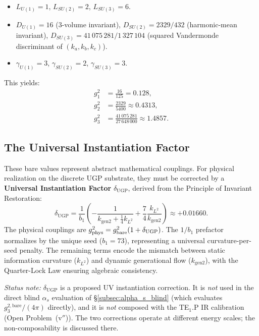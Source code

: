 \documentclass[11pt]{article}
\theoremstyle{remark}
\newcommand{\UGP}{\text{UGP}}
\begin{document}
\begin{tcolorbox}[colback=yellow!6!white,colframe=yellow!40!black,
title=\textbf{Gauge Coupling Master Formula}]
\begin{itemize}[leftmargin=1.2em,itemsep=0.2em]
    \item $L_{U(1)} = 1$, \; $L_{SU(2)} = 2$, \; $L_{SU(3)} = 6$.
    \item $D_{U(1)} = 16$ (3-volume invariant), \; $D_{SU(2)} = 2329/432$ (harmonic-mean invariant), \; $D_{SU(3)} = 41\,075\,281/1\,327\,104$ (squared Vandermonde discriminant of $(k_a, k_b, k_c)$).
    \item $\gamma_{U(1)} = 3$, \; $\gamma_{SU(2)} = 2$, \; $\gamma_{SU(3)} = 3$.
\end{itemize}
This yields:
\[
\begin{aligned}
g_1^2 &= \frac{16}{125} = 0.128, \\
g_2^2 &= \frac{2329}{5400} \approx 0.4313, \\
g_3^2 &= \frac{41\,075\,281}{27\,648\,000} \approx 1.4857.
\end{aligned}
\]
\end{tcolorbox}


\subsection{The Universal Instantiation Factor}

These bare values represent abstract mathematical couplings.
For physical realization on the discrete UGP substrate, they must be corrected by a \textbf{Universal Instantiation Factor} $\delta_{\UGP}$, derived from the Principle of Invariant Restoration:
\begin{equation}
\delta_{\UGP} = \frac{1}{b_1}\left(-\frac{1}{k_{\mathrm{gen2}} + \frac{1}{4}k_{L^2}} + \frac{7}{4}\frac{k_{L^2}}{k_{\mathrm{gen2}}}\right) \approx +0.01660.
\label{eq:instantiation}
\end{equation}
The physical couplings are $g_{\rm phys}^2 = g_{\rm bare}^2 (1 + \delta_{\UGP})$.
The $1/b_1$ prefactor normalizes by the unique seed ($b_1 = 73$), representing a universal curvature-per-seed penalty.
The remaining terms encode the mismatch between static information curvature ($k_{L^2}$) and dynamic generational flow ($k_{\mathrm{gen2}}$), with the Quarter-Lock Law ensuring algebraic consistency.

\noindent\emph{Status note:} $\delta_{\UGP}$ is a proposed UV instantiation correction.  It is \emph{not} used in the direct blind $\alpha_s$ evaluation of \S\ref{subsec:alpha_s_blind} (which evaluates $g_3^{2,\mathrm{bare}}/(4\pi)$ directly), and it is \emph{not} composed with the TE$_1$.P IR calibration (Open Problem~(v$''$)).  The two corrections operate at different energy scales; the non-composability is discussed there.
\end{document}
